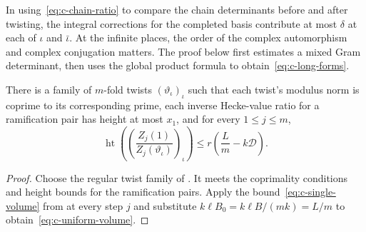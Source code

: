 In using~\eqref{eq:c-chain-ratio} to compare the chain determinants before and after twisting, the integral corrections for the completed basis contribute at most $\delta$ at each of $\iota$ and $\bar\iota$. At the infinite places, the order of the complex automorphism and complex conjugation matters. The proof below first estimates a mixed Gram determinant, then uses the global product formula to obtain~\eqref{eq:c-long-forms}.

\begin{lemma}
\label{lem:c-good-twists-volume}
\emitthmsource
There is a family of $m$-fold twists $(\vartheta_\iota)_\iota$ such that each twist's modulus norm is coprime to its corresponding prime, each inverse Hecke-value ratio for a ramification pair has height at most $x_1$, and for every $1\le j\le m$,
\begin{equation}
 \operatorname{ht}\left(\left(\frac{Z_j(1)}{Z_j(\vartheta_\iota)}\right)_\iota\right)
 \le r\left(\frac{L}{m}-k\mathcal D\right).
\label{eq:c-uniform-volume}
\end{equation}
\end{lemma}
\begin{proof}
Choose the regular twist family of . It meets the coprimality conditions and height bounds for the ramification pairs. Apply the bound~\eqref{eq:c-single-volume} from  at every step $j$ and substitute $k\ell B_0=k\ell B/(mk)=L/m$ to obtain~\eqref{eq:c-uniform-volume}.
\end{proof}

